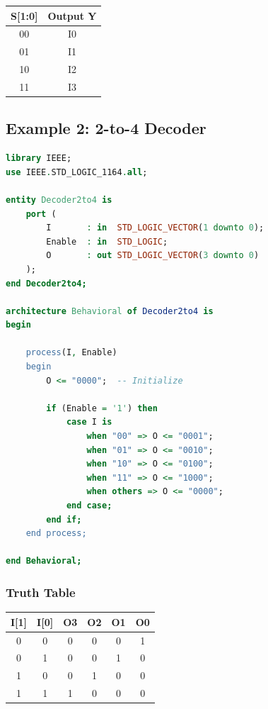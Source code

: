 \documentclass[12pt,a4paper]{article}
\begin{document}
\begin{table}[h]
\centering
\begin{tabular}{|c|c|}
\hline
\textbf{S[1:0]} & \textbf{Output Y} \\
\hline
00 & I0 \\
\hline
01 & I1 \\
\hline
10 & I2 \\
\hline
11 & I3 \\
\hline
\end{tabular}
\end{table}

\newpage
\subsection{Example 2: 2-to-4 Decoder}

\begin{lstlisting}[language=VHDL]
library IEEE;
use IEEE.STD_LOGIC_1164.all;

entity Decoder2to4 is
    port (
        I       : in  STD_LOGIC_VECTOR(1 downto 0);
        Enable  : in  STD_LOGIC;
        O       : out STD_LOGIC_VECTOR(3 downto 0)
    );
end Decoder2to4;

architecture Behavioral of Decoder2to4 is
begin
    
    process(I, Enable)
    begin
        O <= "0000";  -- Initialize
        
        if (Enable = '1') then
            case I is
                when "00" => O <= "0001";
                when "01" => O <= "0010";
                when "10" => O <= "0100";
                when "11" => O <= "1000";
                when others => O <= "0000";
            end case;
        end if;
    end process;
    
end Behavioral;
\end{lstlisting}

\subsubsection{Truth Table}

\begin{table}[h]
\centering
\begin{tabular}{|c|c|c|c|c|c|}
\hline
\textbf{I[1]} & \textbf{I[0]} & \textbf{O3} & \textbf{O2} & \textbf{O1} & \textbf{O0} \\
\hline
0 & 0 & 0 & 0 & 0 & 1 \\
\hline
0 & 1 & 0 & 0 & 1 & 0 \\
\hline
1 & 0 & 0 & 1 & 0 & 0 \\
\hline
1 & 1 & 1 & 0 & 0 & 0 \\
\hline
\end{tabular}
\end{table}
\end{document}
